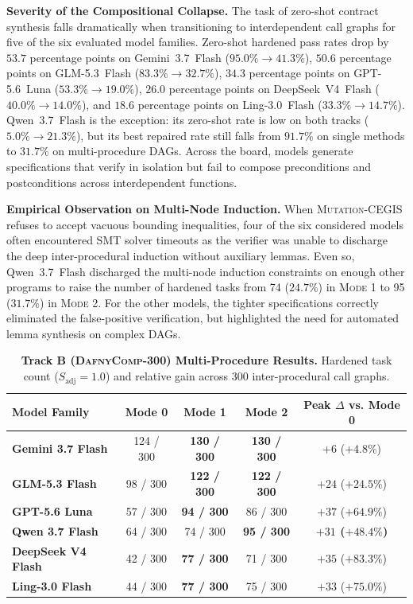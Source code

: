\documentclass{article}
\begin{document}
\textbf{Severity of the Compositional Collapse.} The task of zero-shot contract synthesis falls dramatically when transitioning to interdependent call graphs for five of the six evaluated model families. Zero-shot hardened pass rates drop by $53.7$ percentage points on Gemini~3.7~Flash ($95.0\% \to 41.3\%$), $50.6$ percentage points on GLM-5.3~Flash ($83.3\% \to 32.7\%$), $34.3$ percentage points on GPT-5.6~Luna ($53.3\% \to 19.0\%$), $26.0$ percentage points on DeepSeek~V4~Flash ($40.0\% \to 14.0\%$), and $18.6$ percentage points on Ling-3.0~Flash ($33.3\% \to 14.7\%$). Qwen~3.7~Flash is the exception: its zero-shot rate is low on both tracks ($5.0\% \to 21.3\%$), but its best repaired rate still falls from $91.7\%$ on single methods to $31.7\%$ on multi-procedure DAGs. Across the board, models generate specifications that verify in isolation but fail to compose preconditions and postconditions across interdependent functions.

\textbf{Empirical Observation on Multi-Node Induction.} When \textsc{Mutation-CEGIS} refuses to accept vacuous bounding inequalities, four of the six considered models often encountered SMT solver timeouts as the verifier was unable to discharge the deep inter-procedural induction without auxiliary lemmas. Even so, Qwen~3.7~Flash discharged the multi-node induction constraints on enough other programs to raise the number of hardened tasks from 74 ($24.7\%$) in \textsc{Mode 1} to 95 ($31.7\%$) in \textsc{Mode 2}. For the other models, the tighter specifications correctly eliminated the false-positive verification, but highlighted the need for automated lemma synthesis on complex DAGs.

\begin{table}[!htbp]
\centering
\caption{\textbf{Track B (\textsc{DafnyComp-300}) Multi-Procedure Results.} Hardened task count ($S_{\text{adj}}=1.0$) and relative gain across 300 inter-procedural call graphs.}
\label{tab:track_b}
\setlength{\tabcolsep}{10pt}
\begin{tabular}{lcccc}
\toprule
\textbf{Model Family} & \textbf{Mode 0} & \textbf{Mode 1} & \textbf{Mode 2} & \textbf{Peak $\Delta$ vs. Mode 0} \\
\midrule
\textbf{Gemini 3.7 Flash} & 124 / 300 & \textbf{130 / 300} & \textbf{130 / 300} & $+6$ ($+4.8\%$) \\
\textbf{GLM-5.3 Flash} & 98 / 300 & \textbf{122 / 300} & \textbf{122 / 300} & $+24$ ($+24.5\%$) \\
\textbf{GPT-5.6 Luna} & 57 / 300 & \textbf{94 / 300} & 86 / 300 & $+37$ ($+64.9\%$) \\
\textbf{Qwen 3.7 Flash} & 64 / 300 & 74 / 300 & \textbf{95 / 300} & \textbf{$+31$ ($+48.4\%$)} \\
\textbf{DeepSeek V4 Flash} & 42 / 300 & \textbf{77 / 300} & 71 / 300 & $+35$ ($+83.3\%$) \\
\textbf{Ling-3.0 Flash} & 44 / 300 & \textbf{77 / 300} & 75 / 300 & $+33$ ($+75.0\%$) \\
\bottomrule
\end{tabular}
\end{table}
\end{document}
